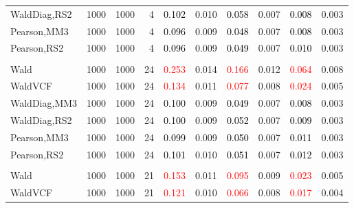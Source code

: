 \documentclass[
]{article}
\begin{document}
\begin{table}[H]
{\begin{tabular}[t]{lrrrrrrlrr}
\hspace{1em}WaldDiag,RS2 & 1000 & 1000 & 4 & \textcolor{black}{0.102} & 0.010 & \textcolor{black}{0.058} & 0.007 & \textcolor{black}{0.008} & 0.003\\
\hspace{1em}Pearson,MM3 & 1000 & 1000 & 4 & \textcolor{black}{0.096} & 0.009 & \textcolor{black}{0.048} & 0.007 & \textcolor{black}{0.008} & 0.003\\
\hspace{1em}Pearson,RS2 & 1000 & 1000 & 4 & \textcolor{black}{0.096} & 0.009 & \textcolor{black}{0.049} & 0.007 & \textcolor{black}{0.010} & 0.003\\
\addlinespace[0.3em]
\multicolumn{10}{l}{\textbf{1F 15V}}\\
\hspace{1em}Wald & 1000 & 1000 & 24 & \textcolor{red}{0.253} & 0.014 & \textcolor{red}{0.166} & 0.012 & \textcolor{red}{0.064} & 0.008\\
\hspace{1em}WaldVCF & 1000 & 1000 & 24 & \textcolor{red}{0.134} & 0.011 & \textcolor{red}{0.077} & 0.008 & \textcolor{red}{0.024} & 0.005\\
\hspace{1em}WaldDiag,MM3 & 1000 & 1000 & 24 & \textcolor{black}{0.100} & 0.009 & \textcolor{black}{0.049} & 0.007 & \textcolor{black}{0.008} & 0.003\\
\hspace{1em}WaldDiag,RS2 & 1000 & 1000 & 24 & \textcolor{black}{0.100} & 0.009 & \textcolor{black}{0.052} & 0.007 & \textcolor{black}{0.009} & 0.003\\
\hspace{1em}Pearson,MM3 & 1000 & 1000 & 24 & \textcolor{black}{0.099} & 0.009 & \textcolor{black}{0.050} & 0.007 & \textcolor{black}{0.011} & 0.003\\
\hspace{1em}Pearson,RS2 & 1000 & 1000 & 24 & \textcolor{black}{0.101} & 0.010 & \textcolor{black}{0.051} & 0.007 & \textcolor{black}{0.012} & 0.003\\
\addlinespace[0.3em]
\multicolumn{10}{l}{\textbf{2F 10V}}\\
\hspace{1em}Wald & 1000 & 1000 & 21 & \textcolor{red}{0.153} & 0.011 & \textcolor{red}{0.095} & 0.009 & \textcolor{red}{0.023} & 0.005\\
\hspace{1em}WaldVCF & 1000 & 1000 & 21 & \textcolor{red}{0.121} & 0.010 & \textcolor{red}{0.066} & 0.008 & \textcolor{red}{0.017} & 0.004\\

\end{tabular}}
\end{table}
\end{document}
